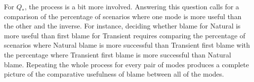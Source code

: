 For $Q_*$, the process is a bit more involved. Answering this question calls for
a comparison of the percentage of scenarios where one mode is more useful than
the other and the inverse.  For instance, deciding whether blame for Natural is
more useful than first blame for Transient requires comparing the percentage
of scenarios where Natural blame is more successful than Transient
first blame with the percentage where Transient first
blame is more successful than Natural blame. Repeating the whole process
for every pair of modes produces a
complete picture of the comparative usefulness of blame between all of the modes.


